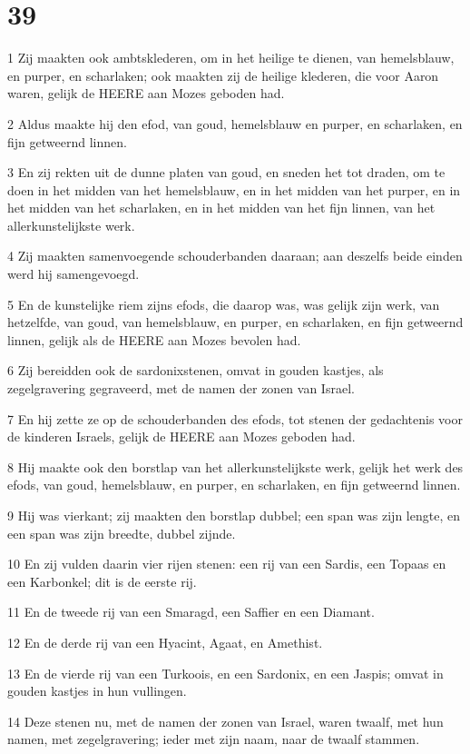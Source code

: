 \chapter{39}

\par 1 Zij maakten ook ambtsklederen, om in het heilige te dienen, van hemelsblauw, en purper, en scharlaken; ook maakten zij de heilige klederen, die voor Aaron waren, gelijk de HEERE aan Mozes geboden had.
\par 2 Aldus maakte hij den efod, van goud, hemelsblauw en purper, en scharlaken, en fijn getweernd linnen.
\par 3 En zij rekten uit de dunne platen van goud, en sneden het tot draden, om te doen in het midden van het hemelsblauw, en in het midden van het purper, en in het midden van het scharlaken, en in het midden van het fijn linnen, van het allerkunstelijkste werk.
\par 4 Zij maakten samenvoegende schouderbanden daaraan; aan deszelfs beide einden werd hij samengevoegd.
\par 5 En de kunstelijke riem zijns efods, die daarop was, was gelijk zijn werk, van hetzelfde, van goud, van hemelsblauw, en purper, en scharlaken, en fijn getweernd linnen, gelijk als de HEERE aan Mozes bevolen had.
\par 6 Zij bereidden ook de sardonixstenen, omvat in gouden kastjes, als zegelgravering gegraveerd, met de namen der zonen van Israel.
\par 7 En hij zette ze op de schouderbanden des efods, tot stenen der gedachtenis voor de kinderen Israels, gelijk de HEERE aan Mozes geboden had.
\par 8 Hij maakte ook den borstlap van het allerkunstelijkste werk, gelijk het werk des efods, van goud, hemelsblauw, en purper, en scharlaken, en fijn getweernd linnen.
\par 9 Hij was vierkant; zij maakten den borstlap dubbel; een span was zijn lengte, en een span was zijn breedte, dubbel zijnde.
\par 10 En zij vulden daarin vier rijen stenen: een rij van een Sardis, een Topaas en een Karbonkel; dit is de eerste rij.
\par 11 En de tweede rij van een Smaragd, een Saffier en een Diamant.
\par 12 En de derde rij van een Hyacint, Agaat, en Amethist.
\par 13 En de vierde rij van een Turkoois, en een Sardonix, en een Jaspis; omvat in gouden kastjes in hun vullingen.
\par 14 Deze stenen nu, met de namen der zonen van Israel, waren twaalf, met hun namen, met zegelgravering; ieder met zijn naam, naar de twaalf stammen.
